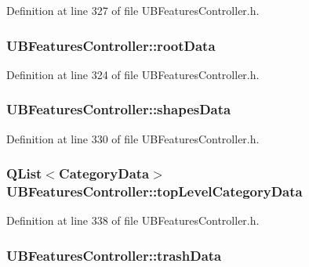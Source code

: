 Definition at line 327 of file U\-B\-Features\-Controller.\-h.

\hypertarget{class_u_b_features_controller_a600c5ec46102f01204da3af436b51cc3}{
\subsubsection[{root\-Data}]{ U\-B\-Features\-Controller\-::root\-Data}}\label{d8/d33/class_u_b_features_controller_a600c5ec46102f01204da3af436b51cc3}


Definition at line 324 of file U\-B\-Features\-Controller.\-h.

\hypertarget{class_u_b_features_controller_a9618c1741e96d986554d89c89448f709}{
\subsubsection[{shapes\-Data}]{ U\-B\-Features\-Controller\-::shapes\-Data}}\label{d8/d33/class_u_b_features_controller_a9618c1741e96d986554d89c89448f709}


Definition at line 330 of file U\-B\-Features\-Controller.\-h.

\hypertarget{class_u_b_features_controller_aa371ff5d43f0238241efb764da577a66}{
\subsubsection[{top\-Level\-Category\-Data}]{\setlength{\rightskip}{0pt plus 5cm}Q\-List$<${\bf Category\-Data}$>$ U\-B\-Features\-Controller\-::top\-Level\-Category\-Data}}\label{d8/d33/class_u_b_features_controller_aa371ff5d43f0238241efb764da577a66}


Definition at line 338 of file U\-B\-Features\-Controller.\-h.

\hypertarget{class_u_b_features_controller_a2a5e91b0b4a93ba5b1b293c3e7b4f170}{
\subsubsection[{trash\-Data}]{ U\-B\-Features\-Controller\-::trash\-Data}}\label{d8/d33/class_u_b_features_controller_a2a5e91b0b4a93ba5b1b293c3e7b4f170}



